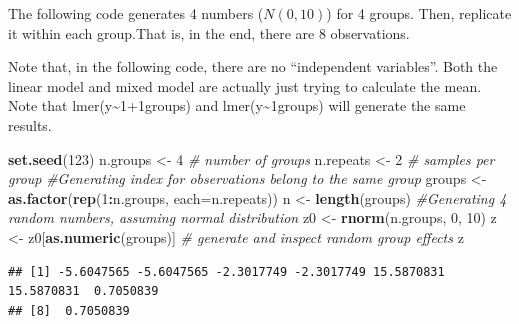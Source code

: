 \documentclass[]{book}
\newenvironment{Shaded}{\begin{snugshade}}{\end{snugshade}}
\newcommand{\KeywordTok}[1]{\textcolor[rgb]{0.13,0.29,0.53}{\textbf{#1}}}
\newcommand{\DataTypeTok}[1]{\textcolor[rgb]{0.13,0.29,0.53}{#1}}
\newcommand{\DecValTok}[1]{\textcolor[rgb]{0.00,0.00,0.81}{#1}}
\newcommand{\StringTok}[1]{\textcolor[rgb]{0.31,0.60,0.02}{#1}}
\newcommand{\CommentTok}[1]{\textcolor[rgb]{0.56,0.35,0.01}{\textit{#1}}}
\newcommand{\OperatorTok}[1]{\textcolor[rgb]{0.81,0.36,0.00}{\textbf{#1}}}
\newcommand{\NormalTok}[1]{#1}
\begin{document}
The following code generates 4 numbers (\(N(0,10)\)) for 4 groups. Then,
replicate it within each group.That is, in the end, there are 8
observations.

Note that, in the following code, there are no ``independent
variables''. Both the linear model and mixed model are actually just
trying to calculate the mean. Note that
lmer(y\textasciitilde{}1+1\textbar{}groups) and
lmer(y\textasciitilde{}1\textbar{}groups) will generate the same
results.

\begin{Shaded}
\begin{Highlighting}[]
\KeywordTok{set.seed}\NormalTok{(}\DecValTok{123}\NormalTok{)}
\NormalTok{n.groups <-}\StringTok{ }\DecValTok{4} \CommentTok{# number of groups}
\NormalTok{n.repeats <-}\StringTok{ }\DecValTok{2} \CommentTok{# samples per group}
\CommentTok{#Generating index for observations belong to the same group}
\NormalTok{groups <-}\StringTok{ }\KeywordTok{as.factor}\NormalTok{(}\KeywordTok{rep}\NormalTok{(}\DecValTok{1}\OperatorTok{:}\NormalTok{n.groups, }\DataTypeTok{each=}\NormalTok{n.repeats))}
\NormalTok{n <-}\StringTok{ }\KeywordTok{length}\NormalTok{(groups)}
\CommentTok{#Generating 4 random numbers, assuming normal distribution}
\NormalTok{z0 <-}\StringTok{ }\KeywordTok{rnorm}\NormalTok{(n.groups, }\DecValTok{0}\NormalTok{, }\DecValTok{10}\NormalTok{) }
\NormalTok{z <-}\StringTok{ }\NormalTok{z0[}\KeywordTok{as.numeric}\NormalTok{(groups)] }\CommentTok{# generate and inspect random group effects}
\NormalTok{z}
\end{Highlighting}
\end{Shaded}

\begin{verbatim}
## [1] -5.6047565 -5.6047565 -2.3017749 -2.3017749 15.5870831 15.5870831  0.7050839
## [8]  0.7050839
\end{verbatim}
\end{document}
